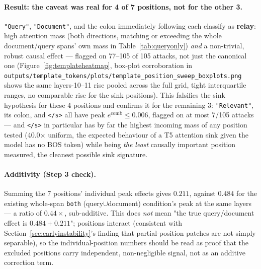 \documentclass[11pt]{article}
\newcommand{\comb}{\ensuremath{e^{\mathrm{comb}}}}
\begin{document}
\paragraph{Result: the caveat was real for 4 of 7 positions, not for the
other 3.} \texttt{"Query"}, \texttt{"Document"}, and the colon immediately
following each classify as \textbf{relay}: high attention mass (both
directions, matching or exceeding the whole document/query spans' own mass
in Table~\ref{tab:queryonly}) \emph{and} a non-trivial, robust causal effect
— flagged on 77--105 of 105 attacks, not just the canonical one
(Figure~\ref{fig:templateheatmap}, box-plot corroboration in
\texttt{outputs/template\_tokens/plots/template\_position\_sweep\_boxplots.png}
shows the same layers-10--11 rise pooled across the full grid, tight
interquartile ranges, no comparable rise for the sink positions). This
falsifies the sink hypothesis for these 4 positions and confirms it for the
remaining 3: \texttt{"Relevant"}, its colon, and \texttt{</s>} all have
peak $\comb \le 0.006$, flagged on at most 7/105 attacks — and \texttt{</s>}
in particular has by far the highest incoming mass of any position tested
(40.0$\times$ uniform, the expected behaviour of a T5 attention sink given
the model has no BOS token) while being \emph{the least} causally important
position measured, the cleanest possible sink signature.

\paragraph{Additivity (Step 3 check).} Summing the 7 positions' individual
peak effects gives $0.211$, against $0.484$ for the existing whole-span
\texttt{both} (query$\cup$document) condition's peak at the same layers —
a ratio of $0.44\times$, sub-additive. This does \emph{not} mean "the true
query/document effect is $0.484 + 0.211$"; positions interact (consistent
with Section~\ref{sec:earlyinstability}'s finding that partial-position
patches are not simply separable), so the individual-position numbers
should be read as proof that the excluded positions carry independent,
non-negligible signal, not as an additive correction term.
\end{document}
